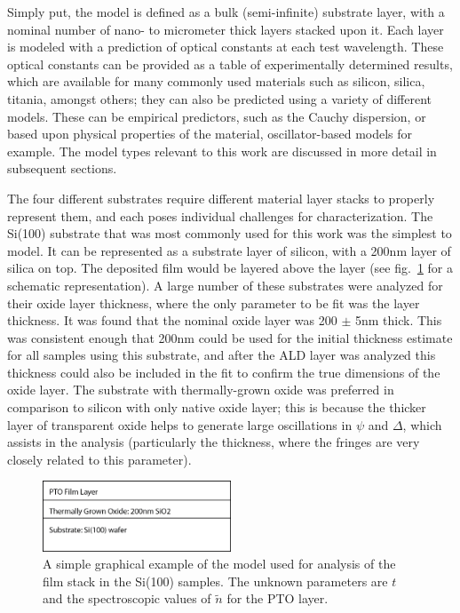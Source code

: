 Simply put, the model is defined as a bulk (semi-infinite) substrate layer, with a nominal number of nano- to micrometer thick layers stacked upon it. Each layer is modeled with a prediction of optical constants at each test wavelength. These optical constants can be provided as a table of experimentally determined results, which are available for many commonly used materials such as silicon, silica, titania, amongst others; they can also be predicted using a variety of different models. These can be empirical predictors, such as the Cauchy dispersion, or based upon physical properties of the material, oscillator-based models for example. The model types relevant to this work are discussed in more detail in subsequent sections. 

The four different substrates require different material layer stacks to properly represent them, and each poses individual challenges for characterization. The Si(100) substrate that was most commonly used for this work was the simplest to model. It can be represented as a substrate layer of silicon, with a 200nm layer of silica on top. The deposited film would be layered above the  layer (see fig.~\ref{fig:Si(100)-model} for a schematic representation). A large number of these substrates were analyzed for their oxide layer thickness, where the only parameter to be fit was the layer thickness. It was found that the nominal oxide layer was 200 $\pm$ 5nm thick. This was consistent enough that 200nm could be used for the initial thickness estimate for all samples using this substrate, and after the ALD layer was analyzed this thickness could also be included in the fit to confirm the true dimensions of the oxide layer. The substrate with thermally-grown oxide was preferred in comparison to silicon with only native oxide layer; this is because the thicker layer of transparent oxide helps to generate large oscillations in $\psi$ and $\Delta$, which assists in the analysis (particularly the thickness, where the fringes are very closely related to this parameter). 

\begin{figure}[htbp]
   \centering
   \includegraphics[width=0.5\textwidth]{./figures/DataAnalysis/ellipsometry-model}
   \caption[Graphical Schematic of VASE Model]{A simple graphical example of the model used for %
   					analysis of the film stack in the Si(100) samples. The unknown parameters %
					are $t$ and the spectroscopic values of $\tilde{n}$ for the PTO layer.}
   \label{fig:Si(100)-model}
\end{figure}

